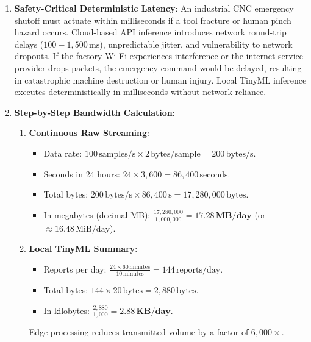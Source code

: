 \begin{enumerate}
    \item \textbf{Safety-Critical Deterministic Latency}:
    An industrial CNC emergency shutoff must actuate within milliseconds if a tool fracture or human pinch hazard occurs. Cloud-based API inference introduces network round-trip delays ($100 - 1{,}500\,\text{ms}$), unpredictable jitter, and vulnerability to network dropouts. If the factory Wi-Fi experiences interference or the internet service provider drops packets, the emergency command would be delayed, resulting in catastrophic machine destruction or human injury. Local TinyML inference executes deterministically in milliseconds without network reliance.

    \item \textbf{Step-by-Step Bandwidth Calculation}:
    \begin{enumerate}
        \item \textbf{Continuous Raw Streaming}:
        \begin{itemize}
            \item Data rate: $100\,\text{samples/s} \times 2\,\text{bytes/sample} = 200\,\text{bytes/s}$.
            \item Seconds in 24 hours: $24 \times 3{,}600 = 86{,}400\,\text{seconds}$.
            \item Total bytes: $200\,\text{bytes/s} \times 86{,}400\,\text{s} = 17{,}280{,}000\,\text{bytes}$.
            \item In megabytes (decimal MB): $\frac{17{,}280{,}000}{1{,}000{,}000} = \mathbf{17.28\,\text{MB/day}}$ (or $\approx 16.48\,\text{MiB/day}$).
        \end{itemize}
        \item \textbf{Local TinyML Summary}:
        \begin{itemize}
            \item Reports per day: $\frac{24 \times 60\,\text{minutes}}{10\,\text{minutes}} = 144\,\text{reports/day}$.
            \item Total bytes: $144 \times 20\,\text{bytes} = 2{,}880\,\text{bytes}$.
            \item In kilobytes: $\frac{2{,}880}{1{,}000} = \mathbf{2.88\,\text{KB/day}}$.
        \end{itemize}
        Edge processing reduces transmitted volume by a factor of $6{,}000\times$.
    \end{enumerate}


\end{enumerate}
